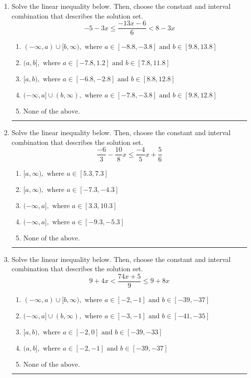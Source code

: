 \documentclass[14pt]{extbook}
\newcommand{\litem}[1]{\item#1\hspace*{-1cm}\rule{\textwidth}{0.4pt}}
\begin{document}
\begin{enumerate}
{\begin{enumerate}[label=\Alph*.]
\end{enumerate} }
\litem{
Solve the linear inequality below. Then, choose the constant and interval combination that describes the solution set.\[ -5 - 3 x \leq \frac{-13 x - 6}{6} < 8 - 3 x \]\begin{enumerate}[label=\Alph*.]
\item \( (-\infty, a) \cup [b, \infty), \text{ where } a \in [-8.8, -3.8] \text{ and } b \in [9.8, 13.8] \)
\item \( (a, b], \text{ where } a \in [-7.8, 1.2] \text{ and } b \in [7.8, 11.8] \)
\item \( [a, b), \text{ where } a \in [-6.8, -2.8] \text{ and } b \in [8.8, 12.8] \)
\item \( (-\infty, a] \cup (b, \infty), \text{ where } a \in [-7.8, -3.8] \text{ and } b \in [9.8, 12.8] \)
\item \( \text{None of the above.} \)

\end{enumerate} }
\litem{
Solve the linear inequality below. Then, choose the constant and interval combination that describes the solution set.\[ \frac{-6}{3} - \frac{10}{8} x \leq \frac{-4}{5} x + \frac{5}{6} \]\begin{enumerate}[label=\Alph*.]
\item \( [a, \infty), \text{ where } a \in [5.3, 7.3] \)
\item \( [a, \infty), \text{ where } a \in [-7.3, -4.3] \)
\item \( (-\infty, a], \text{ where } a \in [3.3, 10.3] \)
\item \( (-\infty, a], \text{ where } a \in [-9.3, -5.3] \)
\item \( \text{None of the above}. \)

\end{enumerate} }
\litem{
Solve the linear inequality below. Then, choose the constant and interval combination that describes the solution set.\[ 9 + 4 x < \frac{74 x + 5}{9} \leq 9 + 8 x \]\begin{enumerate}[label=\Alph*.]
\item \( (-\infty, a) \cup [b, \infty), \text{ where } a \in [-2, -1] \text{ and } b \in [-39, -37] \)
\item \( (-\infty, a] \cup (b, \infty), \text{ where } a \in [-3, -1] \text{ and } b \in [-41, -35] \)
\item \( [a, b), \text{ where } a \in [-2, 0] \text{ and } b \in [-39, -33] \)
\item \( (a, b], \text{ where } a \in [-2, -1] \text{ and } b \in [-39, -37] \)
\item \( \text{None of the above.} \)


\end{enumerate}}
\end{enumerate}
\end{document}
